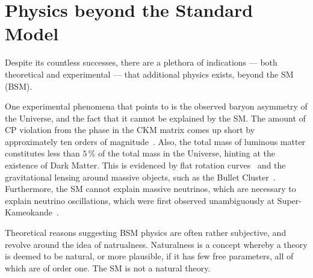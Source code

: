 \section{Physics beyond the Standard Model}

Despite its countless successes, there are a plethora of indications --- both
theoretical and experimental --- that additional physics exists, beyond the SM (BSM).

One experimental phenomena that points to \np is the observed baryon asymmetry of the Universe, and
the fact that it cannot be explained by the SM.
The amount of CP violation from the phase in the CKM matrix comes up short by approximately ten
orders of magnitude~\cite{Cline:2006ts,Huet:1994jb}.
Also, the total mass of luminous matter constitutes less than $5\,\%$ of the
total mass in the Universe, hinting at the existence of Dark Matter.
This is evidenced by flat rotation
curves~\cite{1970ApJ...159..379R,1980ApJ...238..471R} and the gravitational lensing around massive
objects, such as the Bullet Cluster~\cite{Markevitch:2003at}.
Furthermore, the SM cannot explain massive neutrinos, which are necessary to explain neutrino
oscillations, which were first observed unambiguously at
Super-Kameokande~\cite{PhysRevLett.81.1562}.

Theoretical reasons suggesting BSM physics
are often rather subjective, and revolve around the idea of natrualness.
Naturalness is a concept whereby a theory is deemed to be natural, or more plausible, if it has few
free parameters, all of which are of order one.
The SM is not a natural theory.

